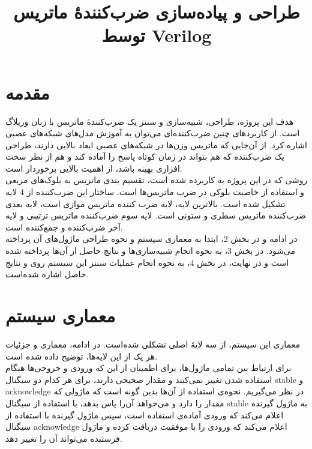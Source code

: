 \documentclass[conference]{IEEEtran-ModifiedForMVIP}
\begin{document}
\IEEEoverridecommandlockouts 

\title{
طراحی و پیاده‌سازی ضرب‌کنندهٔ ماتریس توسط Verilog
}

\author{
}

\maketitle
\begin{abstract}
\end{abstract}
\begin{IEEEkeywords}
\end{IEEEkeywords}


\section{مقدمه}
هدف این پروژه، طراحی، شبیه‌سازی و سنتز یک ضرب‌کنندهٔ ماتریس با زبان وریلاگ است.
از کاربرد‌های چنین ضرب‌کنند‌ه‌ای می‌توان
به آموزش مدل‌های شبکه‌های عصبی 
اشاره کرد.
از آن‌جایی که ماتریس‌ وزن‌ها در شبکه‌های عصبی ابعاد بالایی دارند، طراحی یک ضرب‌کننده که هم بتواند در زمان کوتاه پاسخ را آماده کند و 
هم از نظر سخت افزاری بهینه باشد، از اهمیت بالایی برخوردار است.
\\
روشی که در این پروژه به کاربرده شده است، تقسیم بندی ماتریس به بلوک‌های مربعی و استفاده از خاصیت بلوکی در ضرب ماتریس‌‌ها است. 
ساختار این ضرب‌کننده از 4 لایه تشکیل شده است. بالاترین لایه، لایه ضرب کننده ماتریس موازی است، لایه بعدی ضرب‌کننده 
ماتریس سطری و ستونی است. لایه سوم ضرب‌کننده ماتریس ترتیبی و لایه آخر ضرب‌کننده و جمع‌کننده‌
است.\\
در ادامه و در بخش 2، ابتدا به معماری سیستم و نحوه طراحی ماژول‌های آن پرداخته می‌شود. در بخش 3، به نحوه انجام شبیه‌سازی‌ها
و نتایج حاصل از آن‌ها پرداخته شده است و در نهایت، در بخش 4، به نحوه انجام عملیات سنتز این سیستم روی 
و نتایج حاصل اشاره شده‌است.
\section{معماری سیستم}

معماری این سیستم، از سه لایهٔ اصلی تشکلی شده‌است. در ادامه، معماری و جزئیات هر یک از این لایه‌ها، توضیح داده شده است.
\\
برای ارتباط بین تمامی ماژول‌ها، برای اطمینان از این که ورودی و خروجی‌ها هنگام استفاده شدن تغییر نمی‌کنند و مقدار صحیحی دارند، برای هر کدام دو سیگنال stable و acknowledge در نظر می‌گیریم.
نحوه‌ی استفاده از آن‌ها بدین گونه است که ماژولی که مقدار را دارد و می‌خواهد آن‌را پاس بدهد، با استفاده از سیگنال stable به ماژول گیرنده اعلام می‌کند که ورودی آماده‌ی استفاده است،
 سپس ماژول گیرنده با استفاده از سیگنال acknowledge اعلام می‌کند که ورودی را با موفقیت دریافت کرده و ماژول فرستنده می‌تواند آن را تغییر دهد.
\end{document}
